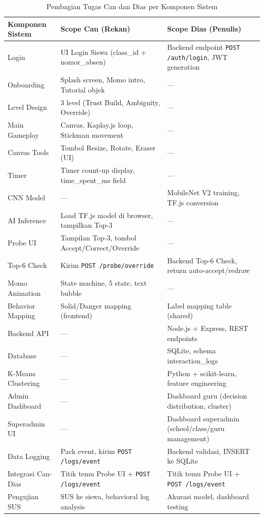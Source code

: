 \documentclass[12pt,a4paper,oneside,openany]{report}
\begin{document}
\begin{table}[H]
\centering
\caption{Pembagian Tugas Can dan Dias per Komponen Sistem}
\label{tab:pembagian-tugas}
\begin{tabular}{|p{4cm}|p{4.5cm}|p{4.5cm}|}
\hline
\textbf{Komponen Sistem} & \textbf{Scope Can (Rekan)} & \textbf{Scope Dias (Penulis)} \\ \hline
Login & UI Login Siswa (class\_id + nomor\_absen) & Backend endpoint \texttt{POST /auth/login}, JWT generation \\ \hline
Onboarding & Splash screen, Momo intro, Tutorial objek & --- \\ \hline
Level Design & 3 level (Trust Build, Ambiguity, Override) & --- \\ \hline
Main Gameplay & Canvas, Kaplay.js loop, Stickman movement & --- \\ \hline
Canvas Tools & Tombol Resize, Rotate, Eraser (UI) & --- \\ \hline
Timer & Timer count-up display, time\_spent\_ms field & --- \\ \hline
CNN Model & --- & MobileNet V2 training, TF.js conversion \\ \hline
AI Inference & Load TF.js model di browser, tampilkan Top-3 & --- \\ \hline
Probe UI & Tampilan Top-3, tombol Accept/Correct/Override & --- \\ \hline
Top-6 Check & Kirim \texttt{POST /probe/override} & Backend Top-6 Check, return auto-accept/redraw \\ \hline
Momo Animation & State machine, 5 state, text bubble & --- \\ \hline
Behavior Mapping & Solid/Danger mapping (frontend) & Label mapping table (shared) \\ \hline
Backend API & --- & Node.js + Express, REST endpoints \\ \hline
Database & --- & SQLite, schema interaction\_logs \\ \hline
K-Means Clustering & --- & Python + scikit-learn, feature engineering \\ \hline
Admin Dashboard & --- & Dashboard guru (decision distribution, cluster) \\ \hline
Superadmin UI & --- & Dashboard superadmin (school/class/guru management) \\ \hline
Data Logging & Pack event, kirim \texttt{POST /logs/event} & Backend validasi, INSERT ke SQLite \\ \hline
Integrasi Can-Dias & Titik temu Probe UI + \texttt{POST /logs/event} & Titik temu Probe UI + \texttt{POST /logs/event} \\ \hline
Pengujian SUS & SUS ke siswa, behavioral log analysis & Akurasi model, dashboard testing \\ \hline
\end{tabular}
\end{table}
\end{document}
